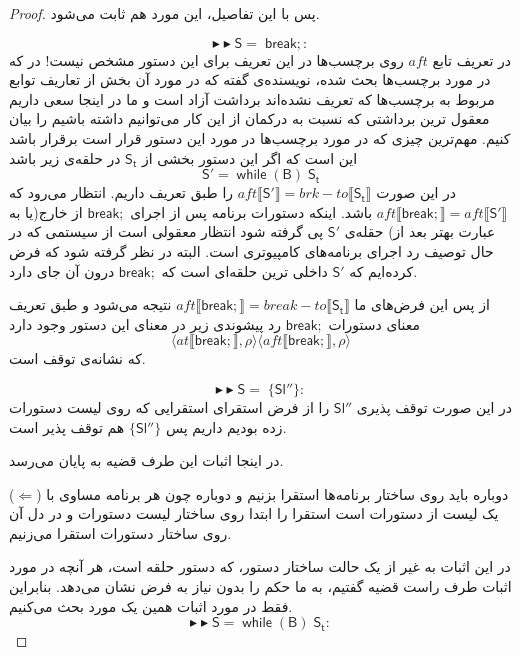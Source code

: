 \begin{proof}
پس با این تفاصیل، این مورد هم ثابت می‌شود.

\break$$\blacktriangleright\blacktriangleright \mathsf{S=\; break;}:$$
در تعریف تابع $aft$ روی برچسب‌ها در \cite{calcul} این تعریف برای این دستور مشخص نیست! در \cite{cousotbook} که در مورد برچسب‌ها بحث شده، نویسنده‌ی \cite{calcul} گفته که در مورد آن بخش از تعاریف توابع مربوط به برچسب‌ها که تعریف نشده‌اند برداشت آزاد است و ما در اینجا سعی داریم معقول ترین برداشتی که نسبت به درکمان از این کار می‌توانیم داشته باشیم را بیان کنیم. مهم‌ترین چیزی که در مورد برچسب‌ها در مورد این دستور قرار است برقرار باشد این است که اگر این دستور بخشی از $\mathsf{S_t}$ در حلقه‌ی زیر باشد
$$\mathsf{S'=\; while\; (B)\; S_t}$$
در این صورت 
$aft \llbracket \mathsf{S'} \rrbracket = brk-to \llbracket \mathsf{S_t} \rrbracket $
را طبق تعریف داریم. انتظار می‌رود که\break 
$aft \llbracket \mathsf{break;} \rrbracket = aft \llbracket \mathsf{S'} \rrbracket$ 
باشد. اینکه دستورات برنامه پس از اجرای $\mathsf{break;}$ از خارج(یا به عبارت بهتر بعد از) حقله‌ی $\mathsf{S'}$ پی گرفته شود انتظار معقولی است از سیستمی که در حال توصیف رد اجرای برنامه‌های کامپیوتری است. البته در نظر گرفته شود که فرض کرده‌ایم که $\mathsf{S'}$ داخلی ترین حلقه‌ای است که $\mathsf{break;}$ درون آن جای دارد.

 از پس این فرض‌های ما 
$aft \llbracket \mathsf{break;} \rrbracket = break-to \llbracket \mathsf{S_t} \rrbracket$ 
نتیجه می‌شود و طبق تعریف معنای دستورات 
$\mathsf{break;}$
رد پیشوندی زیر در معنای این دستور وجود دارد
$$\langle at \llbracket \mathsf{break;} \rrbracket , \rho \rangle
\langle aft \llbracket \mathsf{break;} \rrbracket , \rho \rangle$$
 که نشانه‌ی توقف است.
 

$$\blacktriangleright\blacktriangleright \mathsf{S=\; \{ Sl'' \}}:$$
	در این صورت توقف پذیری $\mathsf{Sl''}$ را از فرض استقرای استقرایی که روی لیست دستورات زده بودیم داریم پس $\mathsf{\{Sl''\}}$ هم توقف پذیر است.
	
	
در اینجا اثبات این طرف قضیه به پایان می‌رسد.

($\Leftarrow$)
دوباره باید روی ساختار برنامه‌ها استقرا بزنیم و دوباره چون هر برنامه مساوی با یک لیست از دستورات است استقرا را ابتدا روی ساختار لیست دستورات و در دل آن روی ساختار دستورات استقرا می‌زنیم.

در این اثبات به غیر از یک حالت ساختار دستور، که دستور حلقه است، هر آنچه در مورد اثبات طرف راست قضیه گفتیم، به ما حکم را بدون نیاز به فرض نشان می‌دهد. بنابراین فقط در مورد اثبات همین یک مورد بحث می‌کنیم. 
$$\blacktriangleright\blacktriangleright \mathsf{S=\; while\; (B)\; S_t}:$$


\end{proof}
